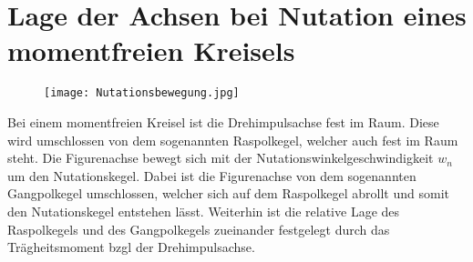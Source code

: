 

\section{Lage der Achsen bei Nutation eines momentfreien Kreisels}

\begin{figure}
    \texttt{[image: Nutationsbewegung.jpg]}
\end{figure}

Bei einem momentfreien Kreisel ist die Drehimpulsachse fest im Raum. Diese wird umschlossen von dem sogenannten \dq Raspolkegel\dq{}, welcher auch fest im Raum steht. Die Figurenachse bewegt sich mit der Nutationswinkelgeschwindigkeit $w_n$ um den Nutationskegel. Dabei ist die Figurenachse von dem sogenannten \dq Gangpolkegel\dq{} umschlossen, welcher sich auf dem Raspolkegel \dq abrollt\dq{} und somit den Nutationskegel entstehen lässt. Weiterhin ist die relative Lage des Raspolkegels und des Gangpolkegels zueinander festgelegt durch das Trägheitsmoment bzgl der Drehimpulsachse. %
